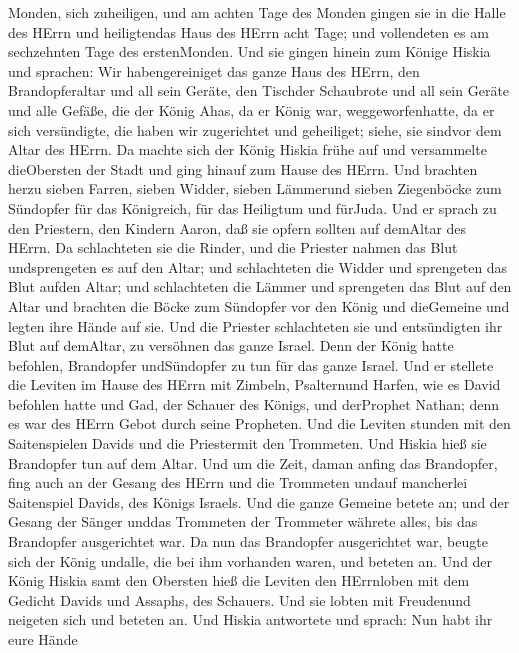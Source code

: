 Monden, sich zuheiligen, und am achten Tage des Monden gingen sie in die
Halle des HErrn und heiligtendas Haus des HErrn acht Tage; und
vollendeten es am sechzehnten Tage des erstenMonden.  Und
sie gingen hinein zum Könige Hiskia und sprachen: Wir habengereiniget
das ganze Haus des HErrn, den Brandopferaltar und all sein Geräte, den
Tischder Schaubrote und all sein Geräte  und alle Gefäße,
die der König Ahas, da er König war, weggeworfenhatte, da er sich
versündigte, die haben wir zugerichtet und geheiliget; siehe, sie
sindvor dem Altar des HErrn.  Da machte sich der König
Hiskia frühe auf und versammelte dieObersten der Stadt und ging hinauf
zum Hause des HErrn.  Und brachten herzu sieben Farren,
sieben Widder, sieben Lämmerund sieben Ziegenböcke zum Sündopfer für das
Königreich, für das Heiligtum und fürJuda. Und er sprach zu den
Priestern, den Kindern Aaron, daß sie opfern sollten auf demAltar des
HErrn.  Da schlachteten sie die Rinder, und die Priester
nahmen das Blut undsprengeten es auf den Altar; und schlachteten die
Widder und sprengeten das Blut aufden Altar; und schlachteten die Lämmer
und sprengeten das Blut auf den Altar  und brachten die
Böcke zum Sündopfer vor den König und dieGemeine und legten ihre Hände
auf sie.  Und die Priester schlachteten sie und
entsündigten ihr Blut auf demAltar, zu versöhnen das ganze Israel. Denn
der König hatte befohlen, Brandopfer undSündopfer zu tun für das ganze
Israel.  Und er stellete die Leviten im Hause des HErrn mit
Zimbeln, Psalternund Harfen, wie es David befohlen hatte und Gad, der
Schauer des Königs, und derProphet Nathan; denn es war des HErrn Gebot
durch seine Propheten.  Und die Leviten stunden mit den
Saitenspielen Davids und die Priestermit den Trommeten. 
Und Hiskia hieß sie Brandopfer tun auf dem Altar. Und um die Zeit, daman
anfing das Brandopfer, fing auch an der Gesang des HErrn und die
Trommeten undauf mancherlei Saitenspiel Davids, des Königs Israels.
 Und die ganze Gemeine betete an; und der Gesang der Sänger
unddas Trommeten der Trommeter währete alles, bis das Brandopfer
ausgerichtet war.  Da nun das Brandopfer ausgerichtet war,
beugte sich der König undalle, die bei ihm vorhanden waren, und beteten
an.  Und der König Hiskia samt den Obersten hieß die
Leviten den HErrnloben mit dem Gedicht Davids und Assaphs, des Schauers.
Und sie lobten mit Freudenund neigeten sich und beteten an.
 Und Hiskia antwortete und sprach: Nun habt ihr eure Hände
